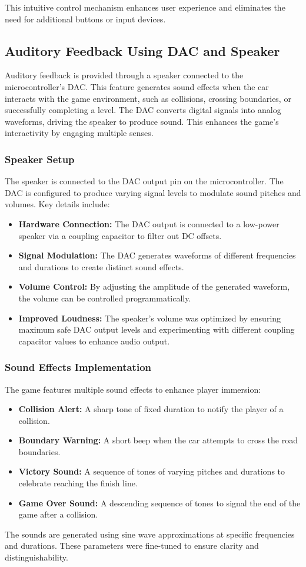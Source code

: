 \documentclass[conference]{IEEEtran}
\begin{document}
This intuitive control mechanism enhances user experience and eliminates the need for additional buttons or input devices.

\subsection{Auditory Feedback Using DAC and Speaker}
Auditory feedback is provided through a speaker connected to the microcontroller's DAC. This feature generates sound effects when the car interacts with the game environment, such as collisions, crossing boundaries, or successfully completing a level. The DAC converts digital signals into analog waveforms, driving the speaker to produce sound. This enhances the game’s interactivity by engaging multiple senses.

\subsubsection{Speaker Setup}
The speaker is connected to the DAC output pin on the microcontroller. The DAC is configured to produce varying signal levels to modulate sound pitches and volumes. Key details include:
\begin{itemize}
    \item \textbf{Hardware Connection:} The DAC output is connected to a low-power speaker via a coupling capacitor to filter out DC offsets.
    \item \textbf{Signal Modulation:} The DAC generates waveforms of different frequencies and durations to create distinct sound effects.
    \item \textbf{Volume Control:} By adjusting the amplitude of the generated waveform, the volume can be controlled programmatically.
    \item \textbf{Improved Loudness:} The speaker's volume was optimized by ensuring maximum safe DAC output levels and experimenting with different coupling capacitor values to enhance audio output.
\end{itemize}

\subsubsection{Sound Effects Implementation}
The game features multiple sound effects to enhance player immersion:
\begin{itemize}
    \item \textbf{Collision Alert:} A sharp tone of fixed duration to notify the player of a collision.
    \item \textbf{Boundary Warning:} A short beep when the car attempts to cross the road boundaries.
    \item \textbf{Victory Sound:} A sequence of tones of varying pitches and durations to celebrate reaching the finish line.
    \item \textbf{Game Over Sound:} A descending sequence of tones to signal the end of the game after a collision.
\end{itemize}
The sounds are generated using sine wave approximations at specific frequencies and durations. These parameters were fine-tuned to ensure clarity and distinguishability.
\end{document}
